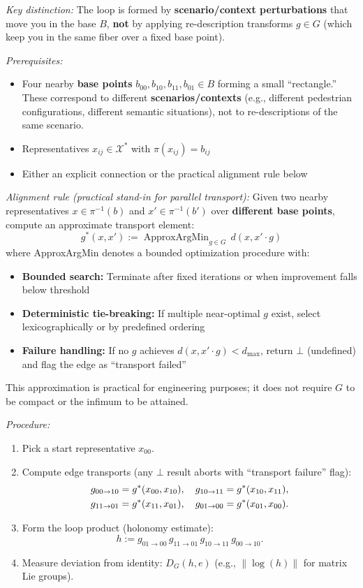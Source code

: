 \documentclass[12pt]{article}
\begin{document}
\emph{Key distinction:} The loop is formed by \textbf{scenario/context perturbations} that move you in
the base $B$, \textbf{not} by applying re-description transforms $g \in G$ (which keep you in the same fiber
over a fixed base point).

\emph{Prerequisites:}
\begin{itemize}
\item Four nearby \textbf{base points} $b_{00}, b_{10}, b_{11}, b_{01} \in B$ forming a small ``rectangle.'' These correspond
to different \textbf{scenarios/contexts} (e.g., different pedestrian configurations, different semantic
situations), not to re-descriptions of the same scenario.
\item Representatives $x_{ij} \in \mathcal{X}^*$ with $\pi(x_{ij}) = b_{ij}$
\item Either an explicit connection or the practical alignment rule below
\end{itemize}

\emph{Alignment rule (practical stand-in for parallel transport):} Given two nearby representatives
$x \in \pi^{-1}(b)$ and $x' \in \pi^{-1}(b')$ over \textbf{different base points}, compute an approximate transport
element:
\[
g^*(x, x') := \operatorname{ApproxArgMin}_{g \in G}\, d(x, x' \cdot g)
\]
where ApproxArgMin denotes a bounded optimization procedure with:
\begin{itemize}
\item \textbf{Bounded search:} Terminate after fixed iterations or when improvement falls below threshold
\item \textbf{Deterministic tie-breaking:} If multiple near-optimal $g$ exist, select lexicographically or by
predefined ordering
\item \textbf{Failure handling:} If no $g$ achieves $d(x, x' \cdot g) < d_{\max}$, return $\bot$ (undefined) and flag the
edge as ``transport failed''
\end{itemize}

This approximation is practical for engineering purposes; it does not require $G$ to be compact or
the infimum to be attained.

\emph{Procedure:}
\begin{enumerate}
\item Pick a start representative $x_{00}$.
\item Compute edge transports (any $\bot$ result aborts with ``transport failure'' flag):
\begin{align}
g_{00 \to 10} &= g^*(x_{00}, x_{10}), \quad g_{10 \to 11} = g^*(x_{10}, x_{11}), \notag \\
g_{11 \to 01} &= g^*(x_{11}, x_{01}), \quad g_{01 \to 00} = g^*(x_{01}, x_{00}). \notag
\end{align}
\item Form the loop product (holonomy estimate):
\[
h := g_{01 \to 00}\, g_{11 \to 01}\, g_{10 \to 11}\, g_{00 \to 10}.
\]
\item Measure deviation from identity: $D_G(h, e)$ (e.g., $\|\log(h)\|$ for matrix Lie groups).
\end{enumerate}
\end{document}
